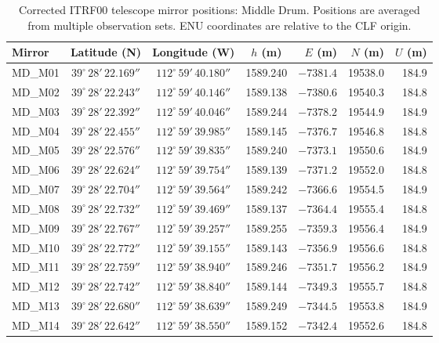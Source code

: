 \documentclass[11pt,letterpaper]{article}
\newcommand{\degree}{^\circ}
\begin{document}
\begin{table}[H]
\centering
\caption{Corrected ITRF00 telescope mirror positions: Middle Drum. Positions are averaged from multiple observation sets. ENU coordinates are relative to the CLF origin.}
\label{tab:md_mirrors}
\smallskip
\footnotesize
\begin{tabular}{@{}lcccrrr@{}}
\toprule
{Mirror} & {Latitude (N)} & {Longitude (W)} & {$h$ (m)} & {$E$ (m)} & {$N$ (m)} & {$U$ (m)} \\
\midrule
MD\_M01 & $39\degree\,28'\,22.169''$ & $112\degree\,59'\,40.180''$ & 1589.240 & $-7381.4$ & 19538.0 & 184.9 \\
MD\_M02 & $39\degree\,28'\,22.243''$ & $112\degree\,59'\,40.146''$ & 1589.138 & $-7380.6$ & 19540.3 & 184.8 \\
MD\_M03 & $39\degree\,28'\,22.392''$ & $112\degree\,59'\,40.046''$ & 1589.244 & $-7378.2$ & 19544.9 & 184.9 \\
MD\_M04 & $39\degree\,28'\,22.455''$ & $112\degree\,59'\,39.985''$ & 1589.145 & $-7376.7$ & 19546.8 & 184.8 \\
MD\_M05 & $39\degree\,28'\,22.576''$ & $112\degree\,59'\,39.835''$ & 1589.240 & $-7373.1$ & 19550.6 & 184.9 \\
MD\_M06 & $39\degree\,28'\,22.624''$ & $112\degree\,59'\,39.754''$ & 1589.139 & $-7371.2$ & 19552.0 & 184.8 \\
MD\_M07 & $39\degree\,28'\,22.704''$ & $112\degree\,59'\,39.564''$ & 1589.242 & $-7366.6$ & 19554.5 & 184.9 \\
MD\_M08 & $39\degree\,28'\,22.732''$ & $112\degree\,59'\,39.469''$ & 1589.137 & $-7364.4$ & 19555.4 & 184.8 \\
MD\_M09 & $39\degree\,28'\,22.767''$ & $112\degree\,59'\,39.257''$ & 1589.255 & $-7359.3$ & 19556.4 & 184.9 \\
MD\_M10 & $39\degree\,28'\,22.772''$ & $112\degree\,59'\,39.155''$ & 1589.143 & $-7356.9$ & 19556.6 & 184.8 \\
MD\_M11 & $39\degree\,28'\,22.759''$ & $112\degree\,59'\,38.940''$ & 1589.246 & $-7351.7$ & 19556.2 & 184.9 \\
MD\_M12 & $39\degree\,28'\,22.742''$ & $112\degree\,59'\,38.840''$ & 1589.144 & $-7349.3$ & 19555.7 & 184.8 \\
MD\_M13 & $39\degree\,28'\,22.680''$ & $112\degree\,59'\,38.639''$ & 1589.249 & $-7344.5$ & 19553.8 & 184.9 \\
MD\_M14 & $39\degree\,28'\,22.642''$ & $112\degree\,59'\,38.550''$ & 1589.152 & $-7342.4$ & 19552.6 & 184.8 \\
\bottomrule
\end{tabular}
\end{table}
\end{document}

